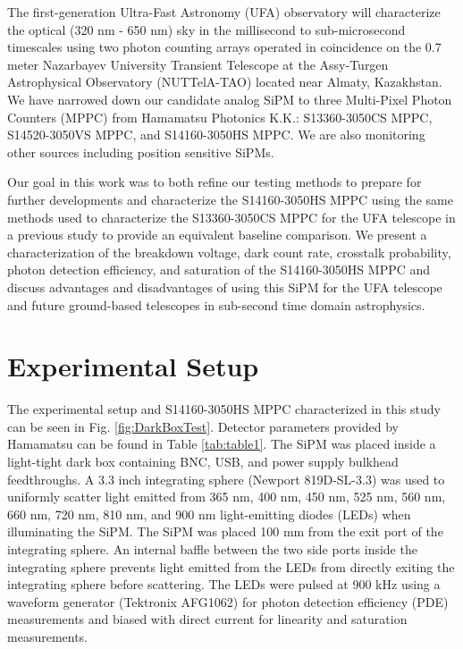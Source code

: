 \documentclass{article}
\begin{document}
The first-generation Ultra-Fast Astronomy (UFA) observatory\cite{li2019program} will characterize the optical (320 nm - 650 nm) sky in the millisecond to sub-microsecond timescales using two photon counting arrays operated in coincidence on the 0.7 meter Nazarbayev University Transient Telescope at the Assy-Turgen Astrophysical Observatory (NUTTelA-TAO) located near Almaty, Kazakhstan. We have narrowed down our candidate analog SiPM to three Multi-Pixel Photon Counters (MPPC) from Hamamatsu Photonics K.K.: S13360-3050CS MPPC, S14520-3050VS MPPC, and S14160-3050HS MPPC. We are also monitoring other sources including position sensitive SiPMs.

Our goal in this work was to both refine our testing methods to prepare for further developments and characterize the S14160-3050HS MPPC using the same methods used to characterize the S13360-3050CS MPPC for the UFA telescope in a previous study\cite{li2019program} to provide an equivalent baseline comparison. We present a characterization of the breakdown voltage, dark count rate, crosstalk probability, photon detection efficiency, and saturation of the S14160-3050HS MPPC and discuss advantages and disadvantages of using this SiPM for the UFA telescope and future ground-based telescopes in sub-second time domain astrophysics.

\section{Experimental Setup}
The experimental setup and S14160-3050HS MPPC characterized in this study can be seen in Fig. \ref{fig:DarkBoxTest}. Detector parameters provided by Hamamatsu\cite{hamamtsu2016s13360} can be found in Table \ref{tab:table1}. The SiPM was placed inside a light-tight dark box containing BNC, USB, and power supply bulkhead feedthroughs. A 3.3 inch integrating sphere (Newport 819D-SL-3.3) was used to uniformly scatter light emitted from 365 nm, 400 nm, 450 nm, 525 nm, 560 nm, 660 nm, 720 nm, 810 nm, and 900 nm light-emitting diodes (LEDs) when illuminating the SiPM. The SiPM was placed 100 mm from the exit port of the integrating sphere. An internal baffle between the two side ports inside the integrating sphere prevents light emitted from the LEDs from directly exiting the integrating sphere before scattering. The LEDs were pulsed at 900 kHz using a waveform generator (Tektronix AFG1062) for photon detection efficiency (PDE) measurements and biased with direct current for linearity and saturation measurements.
\end{document}
